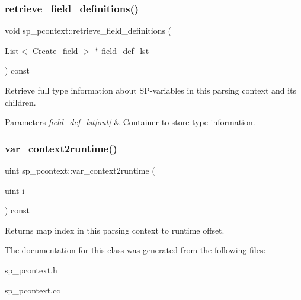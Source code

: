 \subsubsection{\texorpdfstring{retrieve\+\_\+field\+\_\+definitions()}{retrieve\_field\_definitions()}}
{\footnotesize\ttfamily void sp\+\_\+pcontext\+::retrieve\+\_\+field\+\_\+definitions (\begin{DoxyParamCaption}\item[{\mbox{\hyperlink{classList}{List}}$<$ \mbox{\hyperlink{classCreate__field}{Create\+\_\+field}} $>$ $\ast$}]{field\+\_\+def\+\_\+lst }\end{DoxyParamCaption}) const}

Retrieve full type information about SP-\/variables in this parsing context and its children.


\begin{DoxyParams}{Parameters}
{\em field\+\_\+def\+\_\+lst\mbox{[}out\mbox{]}} & Container to store type information. \\
\hline
\end{DoxyParams}
\mbox{\label{classsp__pcontext_a91b66fbcd41167516ec4486c5b1e4b43}} 
\subsubsection{\texorpdfstring{var\+\_\+context2runtime()}{var\_context2runtime()}}
{\footnotesize\ttfamily uint sp\+\_\+pcontext\+::var\+\_\+context2runtime (\begin{DoxyParamCaption}\item[{uint}]{i }\end{DoxyParamCaption}) const\hspace{0.3cm}{\ttfamily [inline]}}

\begin{DoxyReturn}{Returns}
map index in this parsing context to runtime offset. 
\end{DoxyReturn}


The documentation for this class was generated from the following files\+:\begin{DoxyCompactItemize}
\item 
sp\+\_\+pcontext.\+h\item 
sp\+\_\+pcontext.\+cc\end{DoxyCompactItemize}
